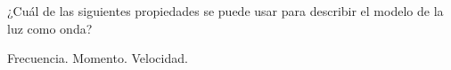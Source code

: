 ¿Cuál de las siguientes propiedades se puede usar para describir
el modelo de la luz como onda?

\begin{oneparcheckboxes}
    \CorrectChoice Frecuencia.
    \choice Momento.
    \CorrectChoice Velocidad.
\end{oneparcheckboxes}